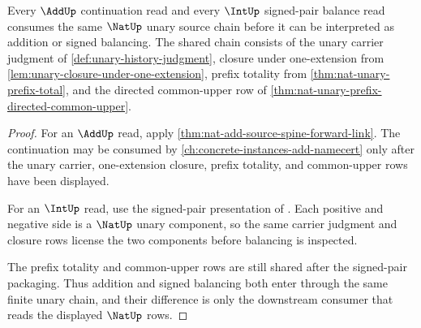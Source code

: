 \begin{theorem}
\label{thm:nat-add-int-unary-chain-orphan-link}
Every $\AddUp$ continuation read and every $\IntUp$ signed-pair balance read consumes the same $\NatUp$ unary source chain before it can be interpreted as addition or signed balancing. The shared chain consists of the unary carrier judgment of \autoref{def:unary-history-judgment}, closure under one-extension from \autoref{lem:unary-closure-under-one-extension}, prefix totality from \autoref{thm:nat-unary-prefix-total}, and the directed common-upper row of \autoref{thm:nat-unary-prefix-directed-common-upper}.
\end{theorem}
\begin{proof}
For an $\AddUp$ read, apply \autoref{thm:nat-add-source-spine-forward-link}. The continuation may be consumed by \autoref{ch:concrete-instances-add-namecert} only after the unary carrier, one-extension closure, prefix totality, and common-upper rows have been displayed.

For an $\IntUp$ read, use the signed-pair presentation of . Each positive and negative side is a $\NatUp$ unary component, so the same carrier judgment and closure rows license the two components before balancing is inspected.

The prefix totality and common-upper rows are still shared after the signed-pair packaging. Thus addition and signed balancing both enter through the same finite unary chain, and their difference is only the downstream consumer that reads the displayed $\NatUp$ rows.
\end{proof}

